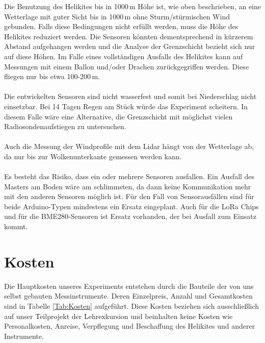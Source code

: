 \documentclass[a4paper,11pt,DIV=calc,tablecaptionabove,headinclude,twoside]{article}
\begin{document}
Die Benutzung des Helikites bis in 1000\,m Höhe ist, wie oben beschrieben, an eine Wetterlage mit guter Sicht bis in 1000\,m ohne Sturm/stürmischen Wind gebunden. Falls diese Bedingungen nicht erfüllt werden, muss die Höhe des Helikites reduziert werden. Die Sensoren könnten dementsprechend in kürzerem Abstand aufgehangen werden und die Analyse der Grenzschicht bezieht sich nur auf diese Höhen. Im Falle eines vollständigen Ausfalls des Helikites kann auf Messungen mit einem Ballon und/oder Drachen zurückgegriffen werden. Diese fliegen nur bis etwa 100-200\,m. \\\\
Die entwickelten Sensoren sind nicht wasserfest und somit bei Niederschlag nicht einsetzbar. Bei 14 Tagen Regen am Stück würde das Experiment scheitern. In diesem Falle wäre eine Alternative, die Grenzschicht mit möglichst vielen Radiosondenaufstiegen zu untersuchen. \\\\
Auch die Messung der Windprofile mit dem Lidar hängt von der Wetterlage ab, da nur bis zur Wolkenunterkante gemessen werden kann. \\\\
Es besteht das Risiko, dass ein oder mehrere Sensoren ausfallen. Ein Ausfall des Masters am Boden wäre am schlimmsten, da dann keine Kommunikation mehr mit den anderen Sensoren möglich ist. Für den Fall von Sensorausfällen sind für beide Arduino-Typen mindestens ein Ersatz eingeplant. Auch für die LoRa Chips und für die BME280-Sensoren ist Ersatz vorhanden, der bei Ausfall zum Einsatz kommt.

\section{Kosten}

Die Hauptkosten unseres Experiments entstehen durch die Bauteile der von uns selbst gebauten Messinstrumente. Deren Einzelpreis, Anzahl und Gesamtkosten sind in Tabelle \ref{Tab:Kosten} aufgeführt. Diese Kosten beziehen sich ausschließlich auf unser Teilprojekt der Lehrexkursion und beinhalten keine Kosten wie Personalkosten, Anreise, Verpflegung und Beschaffung des Helikites und anderer Instrumente. 
\end{document}
